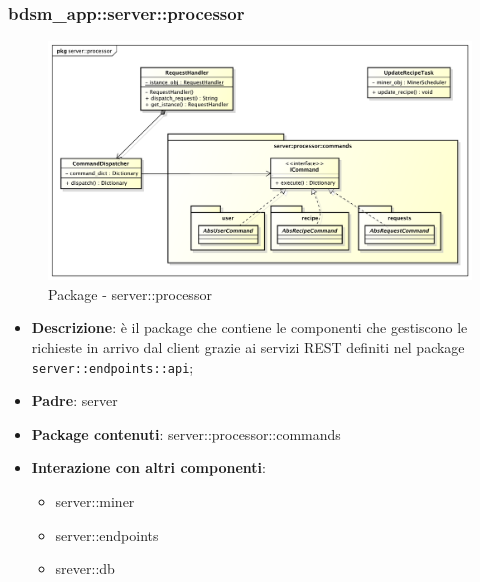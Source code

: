 


\subsubsection{bdsm\_app::server::processor} %
\label{ssub:bdsm_app_server_processor}
\begin{figure}[!htbp]
	\centering
	\centerline{\includegraphics[scale=0.4]{./images/server/processor.pdf}}
	\caption{Package - server::processor}
\end{figure}

\begin{itemize}
  \item \textbf{Descrizione}: è il package che contiene le componenti che gestiscono le richieste in arrivo dal client grazie ai servizi REST definiti nel package \texttt{server::endpoints::api};
  \item \textbf{Padre}: server
  \item \textbf{Package contenuti}: server::processor::commands
  \item \textbf{Interazione con altri componenti}:
    \begin{itemize}
      \item server::miner
      \item server::endpoints
      \item srever::db
    \end{itemize}
\end{itemize}

